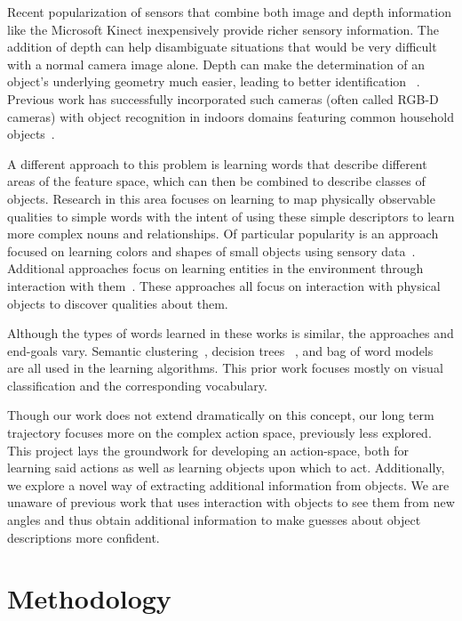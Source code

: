 \documentclass[11pt]{article}
\newcommand{\xxx}[1]{{\bf \color{red} #1}}
\begin{document}
Recent popularization of sensors that combine both image and depth information
like the Microsoft Kinect inexpensively provide richer sensory information. The
addition of depth can help disambiguate situations that would be very difficult
with a normal camera image alone. Depth can make the determination of an object’s
underlying geometry much easier, leading to better identification
~\cite{marton2010hierarchical}.
Previous work has successfully incorporated such cameras (often called RGB-D
cameras) with object recognition in indoors domains featuring common household
objects~\cite{marton2010hierarchical, lai2011sparse}.

A different approach to this problem is learning words that describe different
areas of the feature space, which can then be combined to describe classes of
objects. Research in this area focuses on learning to map physically observable
qualities to simple words with the intent of using these simple descriptors to
learn more complex nouns and relationships. Of particular popularity is an
approach focused on learning colors and shapes of small objects using sensory
data~\cite{zambuto2010visually, roy2002learning}. Additional approaches focus on
learning entities in the environment through interaction with
them~\cite{gold2009robotic}. These approaches all focus on interaction with
physical objects to discover qualities about them.

Although the types of words learned in these works is similar, the approaches and
end-goals vary. Semantic clustering~\cite{zambuto2010visually}, decision trees
~\cite{gold2009robotic}, and bag of word models~\cite{roy2002learning} are all
used in the learning algorithms. This prior work focuses mostly on visual
classification and the corresponding vocabulary.

Though our work does not extend dramatically on this concept, our long term
trajectory focuses more on the complex action space, previously less explored.
This project lays the groundwork for developing an action-space, both for
learning said actions as well as learning objects upon which to act.
Additionally, we explore a novel way of extracting additional information from
objects. We are unaware of previous work that uses interaction with objects to
see them from new angles and thus obtain additional information to make guesses
about object descriptions more confident.


\section{Methodology}
\end{document}

